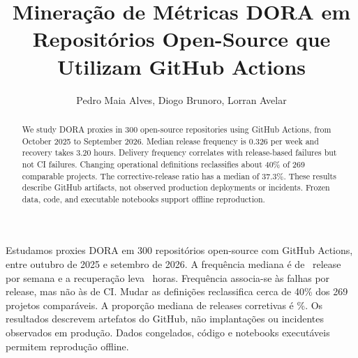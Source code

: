 \documentclass[12pt]{article}
\title{Mineração de Métricas DORA em Repositórios Open-Source que Utilizam GitHub Actions}
\author{Pedro Maia Alves\inst{1}, Diogo Brunoro\inst{1},
  Lorran Avelar\inst{1}}
\begin{document}
\maketitle

\begin{abstract}
  We study DORA proxies in 300 open-source repositories using GitHub Actions,
  from October 2025 to September 2026. Median release frequency is 0.326 per week
  and recovery takes 3.20 hours. Delivery frequency correlates with release-based
  failures but not CI failures. Changing operational definitions reclassifies
  about 40\% of 269 comparable projects. The corrective-release ratio has a median
  of 37.3\%. These results describe GitHub artifacts, not observed production
  deployments or incidents. Frozen data, code, and executable notebooks support
  offline reproduction.
\end{abstract}

\begin{resumo}
  Estudamos proxies DORA em 300 repositórios open-source com GitHub Actions,
  entre outubro de 2025 e setembro de 2026. A frequência mediana é de
  \labAFreqMediana\ release por semana e a recuperação leva \labARecMediana~horas.
  Frequência associa-se às falhas por release, mas não às de CI. Mudar as definições
  reclassifica cerca de 40\% dos 269 projetos comparáveis. A proporção mediana de
  releases corretivas é \labCReworkMediana\%. Os resultados descrevem artefatos
  do GitHub, não implantações ou incidentes observados em produção. Dados congelados,
  código e notebooks executáveis permitem reprodução offline.
\end{resumo}








\end{document}
